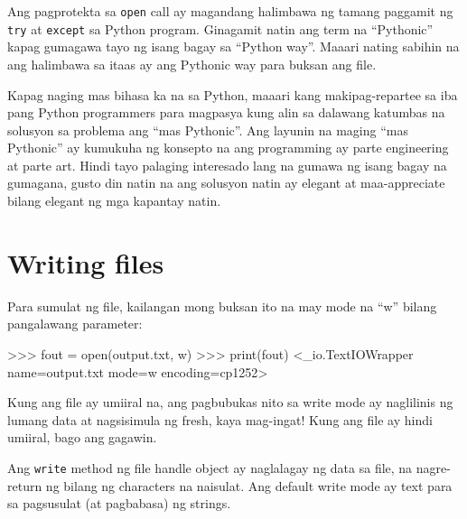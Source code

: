 \documentclass[10pt,]{book}
\newenvironment{Shaded}{}{}
\newcommand{\BuiltInTok}[1]{\textcolor[rgb]{0.00,0.50,0.00}{#1}}
\newcommand{\NormalTok}[1]{#1}
\newcommand{\OperatorTok}[1]{\textcolor[rgb]{0.40,0.40,0.40}{#1}}
\newcommand{\StringTok}[1]{\textcolor[rgb]{0.25,0.44,0.63}{#1}}
\begin{document}

Ang pagprotekta sa \texttt{open} call ay magandang halimbawa ng tamang
paggamit ng \texttt{try} at \texttt{except} sa Python program. Ginagamit
natin ang term na ``Pythonic'' kapag gumagawa tayo ng isang bagay sa
``Python way''. Maaari nating sabihin na ang halimbawa sa itaas ay ang
Pythonic way para buksan ang file.

Kapag naging mas bihasa ka na sa Python, maaari kang makipag-repartee sa
iba pang Python programmers para magpasya kung alin sa dalawang katumbas
na solusyon sa problema ang ``mas Pythonic''. Ang layunin na maging
``mas Pythonic'' ay kumukuha ng konsepto na ang programming ay parte
engineering at parte art. Hindi tayo palaging interesado lang na gumawa
ng isang bagay na gumagana, gusto din natin na ang solusyon natin ay
elegant at maa-appreciate bilang elegant ng mga kapantay natin.

\section{Writing files}\label{writing-files}


Para sumulat ng file, kailangan mong buksan ito na may mode na ``w''
bilang pangalawang parameter:

\begin{Shaded}
\begin{Highlighting}[]
\OperatorTok{\textgreater{}\textgreater{}\textgreater{}}\NormalTok{ fout }\OperatorTok{=} \BuiltInTok{open}\NormalTok{(}\StringTok{\textquotesingle{}output.txt\textquotesingle{}}\NormalTok{, }\StringTok{\textquotesingle{}w\textquotesingle{}}\NormalTok{)}
\OperatorTok{\textgreater{}\textgreater{}\textgreater{}} \BuiltInTok{print}\NormalTok{(fout)}
\OperatorTok{\textless{}}\NormalTok{\_io.TextIOWrapper name}\OperatorTok{=}\StringTok{\textquotesingle{}output.txt\textquotesingle{}}\NormalTok{ mode}\OperatorTok{=}\StringTok{\textquotesingle{}w\textquotesingle{}}\NormalTok{ encoding}\OperatorTok{=}\StringTok{\textquotesingle{}cp1252\textquotesingle{}}\OperatorTok{\textgreater{}}
\end{Highlighting}
\end{Shaded}

Kung ang file ay umiiral na, ang pagbubukas nito sa write mode ay
naglilinis ng lumang data at nagsisimula ng fresh, kaya mag-ingat! Kung
ang file ay hindi umiiral, bago ang gagawin.

Ang \texttt{write} method ng file handle object ay naglalagay ng data sa
file, na nagre-return ng bilang ng characters na naisulat. Ang default
write mode ay text para sa pagsusulat (at pagbabasa) ng strings.
\end{document}
